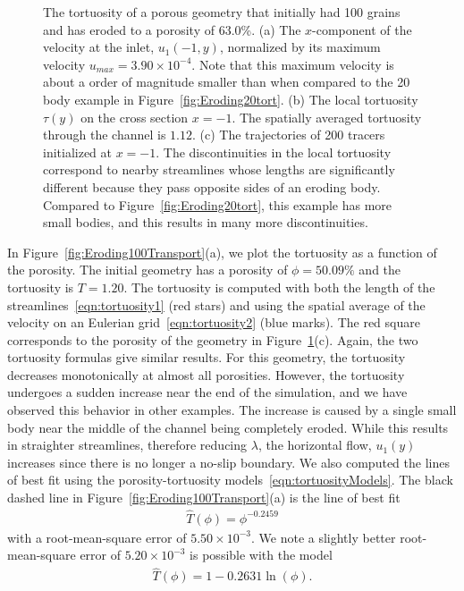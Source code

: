 \documentclass[preprint,10pt]{elsarticle}
\begin{document}
\begin{figure}[H]
\begin{subfigure}[b]{0.5\textwidth}
\caption{}
\end{subfigure}
\caption{\label{fig:Eroding100tort} The tortuosity of a porous geometry
that initially had 100 grains and has eroded to a porosity of 63.0\%.
(a) The $x$-component of the velocity at the inlet, $u_1(-1, y)$,
normalized by its maximum velocity $u_{max}=3.90 \times 10^{-4}$.  Note
that this maximum velocity is about a order of magnitude smaller than
when compared to the 20 body example in Figure~\ref{fig:Eroding20tort}.
(b) The local tortuosity $\tau(y)$ on the cross section $x = -1$. The
spatially averaged tortuosity through the channel is $1.12$. (c) The
trajectories of 200 tracers initialized at $x = -1$.  The
discontinuities in the local tortuosity correspond to nearby streamlines
whose lengths are significantly different because they pass opposite
sides of an eroding body. Compared to Figure~\ref{fig:Eroding20tort},
this example has more small bodies, and this results in many more
discontinuities.}
\end{figure}

In Figure~\ref{fig:Eroding100Transport}(a), we plot the tortuosity as a
function of the porosity.  The initial geometry has a porosity of $\phi
= 50.09\%$ and the tortuosity is $T = 1.20$.  The tortuosity is computed
with both the length of the streamlines~\eqref{eqn:tortuosity1} (red
stars) and using the spatial average of the velocity on an Eulerian
grid~\eqref{eqn:tortuosity2} (blue marks).  The red square corresponds
to the porosity of the geometry in Figure~\ref{fig:Eroding100tort}(c).
Again, the two tortuosity formulas give similar results.  For this
geometry, the tortuosity decreases monotonically at almost all
porosities.  However, the tortuosity undergoes a sudden increase near
the end of the simulation, and we have observed this behavior in other
examples.  The increase is caused by a single small body near the middle
of the channel being completely eroded.  While this results in
straighter streamlines, therefore reducing $\lambda$, the horizontal
flow, $u_1(y)$ increases since there is no longer a no-slip boundary.
We also computed the lines of best fit using the porosity-tortuosity
models~\eqref{eqn:tortuosityModels}.  The black dashed line in
Figure~\ref{fig:Eroding100Transport}(a) is the line of best fit
\begin{align}
  \widehat{T}(\phi) = \phi^{-0.2459}
\end{align}
with a root-mean-square error of $5.50 \times 10^{-3}$.  We note a
slightly better root-mean-square error of $5.20 \times 10^{-3}$ is
possible with the model
\begin{align}
  \widehat{T}(\phi) = 1 - 0.2631 \ln(\phi).
\end{align}
\end{document}
